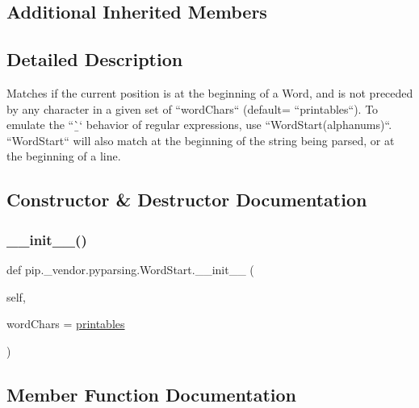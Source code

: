 \subsection*{Additional Inherited Members}


\subsection{Detailed Description}
\begin{DoxyVerb}Matches if the current position is at the beginning of a Word,
and is not preceded by any character in a given set of
``wordChars`` (default= ``printables``). To emulate the
``\b`` behavior of regular expressions, use
``WordStart(alphanums)``. ``WordStart`` will also match at
the beginning of the string being parsed, or at the beginning of
a line.
\end{DoxyVerb}
 

\subsection{Constructor \& Destructor Documentation}
\mbox{\label{classpip_1_1__vendor_1_1pyparsing_1_1WordStart_a703c0be0af0ace588d77d91f25e23092}} 
\subsubsection{\texorpdfstring{\+\_\+\+\_\+init\+\_\+\+\_\+()}{\_\_init\_\_()}}
{\footnotesize\ttfamily def pip.\+\_\+vendor.\+pyparsing.\+Word\+Start.\+\_\+\+\_\+init\+\_\+\+\_\+ (\begin{DoxyParamCaption}\item[{}]{self,  }\item[{}]{word\+Chars = {\ttfamily \hyperlink{namespacepip_1_1__vendor_1_1pyparsing_ac9075b160f22a7b6557fff8c2fb1f329}{printables}} }\end{DoxyParamCaption})}



\subsection{Member Function Documentation}
\mbox{\label{classpip_1_1__vendor_1_1pyparsing_1_1WordStart_af40797b120d256528b354cd3d425d290}} 
